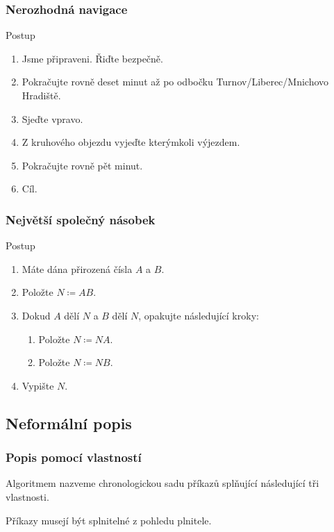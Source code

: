 \documentclass[aspectratio=169,11pt,svgnames]{beamer}
\begin{document}
\begin{frame}
 \frametitle{Nerozhodná navigace}
 \begin{block}{Postup}
  \begin{enumerate}
   \item Jsme připraveni. Řiďte bezpečně.
   \item Pokračujte rovně deset minut až po odbočku Turnov/Liberec/Mnichovo
    Hradiště.
   \item Sjeďte vpravo.
   \item Z kruhového objezdu vyjeďte kterýmkoli výjezdem.
   \item Pokračujte rovně pět minut.
   \item Cíl.
  \end{enumerate}
 \end{block}
\end{frame}

\begin{frame}
 \frametitle{Největší společný násobek}
 \begin{block}{Postup}
  \begin{enumerate}
   \item Máte dána přirozená čísla $A$ a $B$.
   \item Položte $N \coloneqq AB$.
   \item Dokud $A$ dělí $N$ a $B$ dělí $N$, opakujte následující kroky:
    \begin{enumerate}[label=\roman*.]
     \item Položte $N \coloneqq NA$.
     \item Položte $N \coloneqq NB$.
    \end{enumerate}
   \item Vypište $N$.
  \end{enumerate}
 \end{block}
\end{frame}

\subsection{Neformální popis}
\begin{frame}
 \subsectionpage
\end{frame}

\begin{frame}
 \frametitle{Popis pomocí vlastností}
 Algoritmem nazveme \alert{chronologickou sadu příkazů} splňující
 následující tři vlastnosti.
 \pause
 \begin{tcolorbox}[title=Vlastnost 1: splnitelnost,width=.8\textwidth,center]
  Příkazy musejí být splnitelné \alert{z pohledu plnitele}.
 \end{tcolorbox}
\end{frame}
\end{document}
